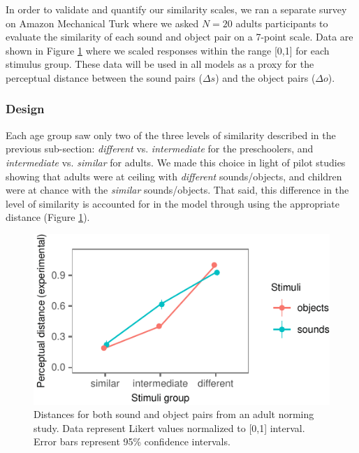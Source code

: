 \documentclass[english,,man,floatsintext]{apa6}
\theoremstyle{definition}
\theoremstyle{definition}
\theoremstyle{definition}
\theoremstyle{remark}
\begin{document}
In order to validate and quantify our similarity scales, we ran a
separate survey on Amazon Mechanical Turk where we asked \(N=20\) adults
participants to evaluate the similarity of each sound and object pair on
a 7-point scale. Data are shown in Figure \ref{fig:stim} where we scaled
responses within the range {[}0,1{]} for each stimulus group. These data
will be used in all models as a proxy for the perceptual distance
between the sound pairs (\(\Delta s\)) and the object pairs
(\(\Delta o\)).

\subsubsection{Design}\label{design}

Each age group saw only two of the three levels of similarity described
in the previous sub-section: \emph{different} vs. \emph{intermediate}
for the preschoolers, and \emph{intermediate} vs. \emph{similar} for
adults. We made this choice in light of pilot studies showing that
adults were at ceiling with \emph{different} sounds/objects, and
children were at chance with the \emph{similar} sounds/objects. That
said, this difference in the level of similarity is accounted for in the
model through using the appropriate distance (Figure \ref{fig:stim}).

\begin{figure}[h]

{\centering \includegraphics{ms_files/figure-latex/stim-1} 

}

\caption{Distances for both sound and object pairs from an adult norming study. Data represent Likert values normalized to [0,1] interval. Error bars represent 95\% confidence intervals.}\label{fig:stim}
\end{figure}
\end{document}
